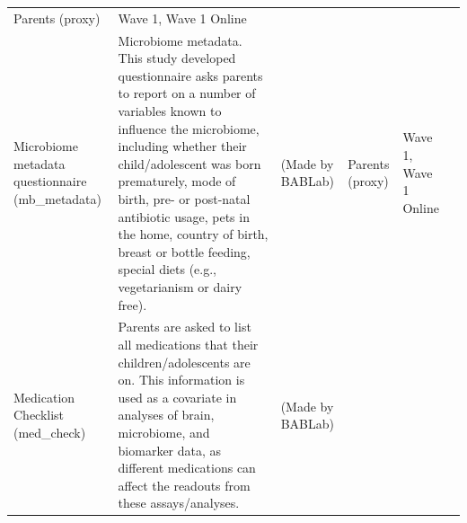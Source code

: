 \documentclass[
]{book}
\begin{document}
\begin{longtable}[]{@{}llllll@{}}
\begin{minipage}[t]{0.16\columnwidth}
Parents (proxy)\strut
\end{minipage} & \begin{minipage}[t]{0.06\columnwidth}\raggedright
Wave 1, Wave 1 Online\strut
\end{minipage} & \begin{minipage}[t]{0.10\columnwidth}\raggedright
\strut
\end{minipage}\tabularnewline
\begin{minipage}[t]{0.18\columnwidth}\raggedright
Microbiome metadata questionnaire (mb\_metadata)\strut
\end{minipage} & \begin{minipage}[t]{0.18\columnwidth}\raggedright
Microbiome metadata. This study developed questionnaire asks parents to report on a number of variables known to influence the microbiome, including whether their child/adolescent was born prematurely, mode of birth, pre- or post-natal antibiotic usage, pets in the home, country of birth, breast or bottle feeding, special diets (e.g., vegetarianism or dairy free).\strut
\end{minipage} & \begin{minipage}[t]{0.15\columnwidth}\raggedright
(Made by BABLab)\strut
\end{minipage} & \begin{minipage}[t]{0.16\columnwidth}\raggedright
Parents (proxy)\strut
\end{minipage} & \begin{minipage}[t]{0.06\columnwidth}\raggedright
Wave 1, Wave 1 Online\strut
\end{minipage} & \begin{minipage}[t]{0.10\columnwidth}\raggedright
\strut
\end{minipage}\tabularnewline
\begin{minipage}[t]{0.18\columnwidth}\raggedright
Medication Checklist (med\_check)\strut
\end{minipage} & \begin{minipage}[t]{0.18\columnwidth}\raggedright
Parents are asked to list all medications that their children/adolescents are on. This information is used as a covariate in analyses of brain, microbiome, and biomarker data, as different medications can affect the readouts from these assays/analyses.\strut
\end{minipage} & \begin{minipage}[t]{0.15\columnwidth}\raggedright
(Made by BABLab)\strut
\end{minipage} & \begin{minipage}[t]{0.16\columnwidth}\raggedright

\end{minipage}
\end{longtable}
\end{document}
